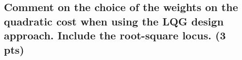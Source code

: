 \subsection{Comment on the choice of the weights on the quadratic cost when using the LQG design approach. Include the root-square locus. (3 pts)}
\vspace{10pt}

